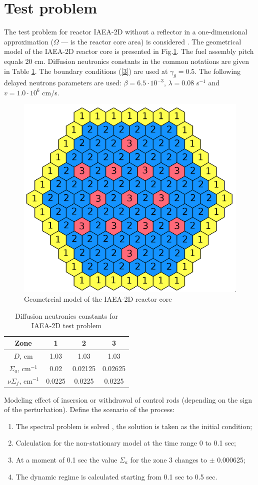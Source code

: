 \documentclass[runningheads]{llncs}
\begin{document}
\section{Test problem}
The test problem for reactor IAEA-2D without a reflector in a one-dimensional approximation ($\Omega$ --- is the reactor core area) is considered \cite{Chao}. The geometrical model of the IAEA-2D reactor core is presented in Fig.\ref{fig:1}. The fuel assembly pitch equals 20 cm. Diffusion neutronics constants in the common notations are given in Table \ref{t-1}. 
The boundary conditions (\ref{3}) are used at $\gamma_g = 0.5$.
The following delayed neutrons parameters are used: $\beta = 6.5 \cdot 10^{−3}$, $\lambda = 0.08$ s$^{-1}$ and $v = 1.0 \cdot 10^6$ cm/s.
\begin{figure}[ht]
  \begin{center}
    \includegraphics[width=0.48\linewidth] {1.png}
	\caption{Geometrcial model of the IAEA-2D reactor core}
	\label{fig:1}
  \end{center}
\end{figure} 
\begin{table}[ht]
\caption{Diffusion neutronics constants for IAEA-2D test problem}
\label{t-1}
\begin{center}
\begin{tabular}{cccc}
\hline
Zone & 1 & 2 & 3\\
\hline
$D$, cm & 1.03 & 1.03 & 1.03 \\
$\Sigma_a$, cm$^{-1}$ & 0.02 & 0.02125 & 0.02625 \\
$\nu\Sigma_{f}$, cm$^{-1}$ & 0.0225 & 0.0225 & 0.0225\\
\hline
\end{tabular}
\end{center}
\end{table}
Modeling effect of insersion or withdrawal of control rods (depending on the sign of the perturbation). Define the scenario of the process:
\begin{enumerate} 
\item The spectral problem is solved \cite{Annals17}, the solution is taken as the initial condition;
\item Calculation for the non-stationary model at the time range 0 to 0.1 sec;
\item At a moment of 0.1 sec the value $\Sigma_a$ for the zone 3 changes to $\pm$ 0.000625;
\item The dynamic regime is calculated starting from 0.1 sec to 0.5 sec.
\end{enumerate}
\end{document}
